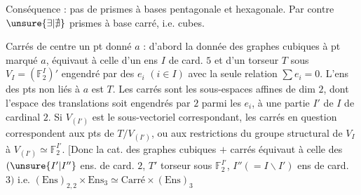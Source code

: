 Conséquence : pas de prismes à bases pentagonale et hexagonale. Par contre $\unsure{\exists|\nexists}$ prismes à base carré, i.e. cubes.


Carrés de centre un pt donné $a$ : d'abord la donnée des graphes cubiques à pt marqué $a$, équivaut à celle d'un ens $I$ de card. $5$ et d'un torseur $T$ sous $V_I=(\mathbb F_2^I)'$  engendré par des $e_i$ $(i\in I)$ avec la seule relation $\sum e_i=0$. L'ens des pts non liés à $a$ est $T$. Les  carrés sont les sous-espaces affines de dim $2$, dont l'espace des translations soit engendrés par $2$ parmi les $e_i$,  à une partie $I'$ de $I$ de cardinal $2$. Si $V_{(I')}$ est le sous-vectoriel correspondant, les carrés en question correspondent aux pts de $T/V_{(I')}$, ou aux restrictions du groupe structural de $V_I$ à $V_{(I')}\simeq\mathbb F_2^{I'}$. $[$Donc la cat. des graphes cubiques $+$ carrés équivaut à celle des   $(\unsure{I'|I''}$ ens. de card. $2$, $T'$ torseur sous $\mathbb F_2^{I'}$, $I''(=I\backslash I')$ ens de card. $3)$ i.e. $(\mathrm{Ens})_{2,2}\times\mathrm{Ens}_3\simeq\text{Carré}\times(\mathrm{Ens})_3$
